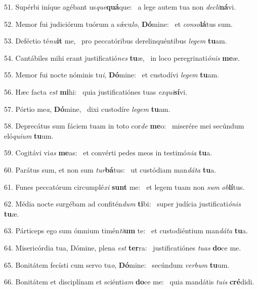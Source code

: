 51. Supérbi iníque agébant us\textit{que}\textbf{quá}que: \ast\  a lege autem tua non \textit{de}\textit{cli}\textbf{ná}vi.\

52. Memor fui judiciórum tuórum a sǽcu\textit{lo}, \textbf{Dó}mine: \ast\  et \textit{con}\textit{so}\textbf{lá}tus sum.\

53. Deféctio té\textit{nu}\textbf{it} me, \ast\  pro peccatóribus derelinquéntibus \textit{le}\textit{gem} \textbf{tu}am.\

54. Cantábiles mihi erant justificatió\textit{nes} \textbf{tu}æ, \ast\  in loco peregrinati\textit{ó}\textit{nis} \textbf{me}æ.\

55. Memor fui nocte nóminis tu\textit{i}, \textbf{Dó}mine: \ast\  et custodívi \textit{le}\textit{gem} \textbf{tu}am.\

56. Hæc facta \textit{est} \textbf{mi}hi: \ast\  quia justificatiónes tuas \textit{ex}\textit{qui}\textbf{sí}vi.\

57. Pórtio me\textit{a}, \textbf{Dó}mine, \ast\  dixi custodíre \textit{le}\textit{gem} \textbf{tu}am.\

58. Deprecátus sum fáciem tuam in toto cor\textit{de} \textbf{me}o: \ast\  miserére mei secúndum eló\textit{qui}\textit{um} \textbf{tu}um.\

59. Cogitávi vi\textit{as} \textbf{me}as: \ast\  et convérti pedes meos in testimó\textit{ni}\textit{a} \textbf{tu}a.\

60. Parátus sum, et non sum \textit{tur}\textbf{bá}tus: \ast\  ut custódiam man\textit{dá}\textit{ta} \textbf{tu}a.\

61. Funes peccatórum circumplé\textit{xi} \textbf{sunt} me: \ast\  et legem tuam non \textit{sum} \textit{ob}\textbf{lí}tus.\

62. Média nocte surgébam ad confitén\textit{dum} \textbf{ti}bi: \ast\  super judícia justificati\textit{ó}\textit{nis} \textbf{tu}æ.\

63. Párticeps ego sum ómnium timén\textit{ti}\textbf{um} te: \ast\  et custodiéntium man\textit{dá}\textit{ta} \textbf{tu}a.\

64. Misericórdia tua, Dómine, plena \textit{est} \textbf{ter}ra: \ast\  justificatiónes \textit{tu}\textit{as} \textbf{do}ce me.\

65. Bonitátem fecísti cum servo tu\textit{o}, \textbf{Dó}mine: \ast\  secúndum \textit{ver}\textit{bum} \textbf{tu}um.\

66. Bonitátem et disciplínam et sciénti\textit{am} \textbf{do}ce me: \ast\  quia mandátis \textit{tu}\textit{is} \textbf{cré}didi.\

